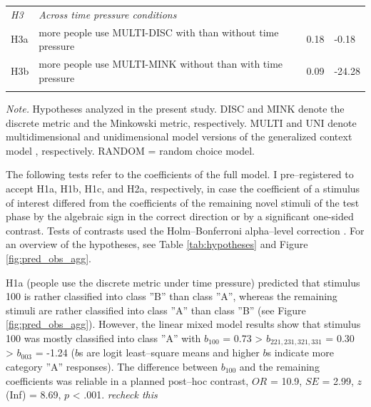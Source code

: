 \documentclass[a4paper,man,natbib]{apa6}
\begin{document}
\begin{table}
\begin{center}
\begin{threeparttable}
\begin{tabular*}{\textwidth}{lp{55mm}p{100mm}ll}
\midrule
\multicolumn{1}{l}{\emph{H3}} & \multicolumn{1}{l}{\emph{Across time pressure conditions}} \\
\addlinespace
H3a & \multicolumn{2}{p{150mm}}{more people use MULTI-DISC with than without time pressure} & 0.18 & -0.18\\
\addlinespace
H3b & \multicolumn{2}{p{150mm}}{more people use MULTI-MINK without than with time pressure} & 0.09 & -24.28\\
\bottomrule
\addlinespace
\end{tabular*}
\begin{tablenotes}[para]
\textit{Note.} Hypotheses analyzed in the present study. DISC and MINK denote the discrete metric and the Minkowski metric, respectively. MULTI and UNI denote multidimensional and unidimensional model versions of the generalized context model \citep{nosofsky1989further}, respectively. RANDOM = random choice model.
\end{tablenotes}
\end{threeparttable}
\end{center}
\end{table}
\vspace{\baselineskip}

The following tests refer to the coefficients of the full model. I pre--registered to accept H1a, H1b, H1c, and H2a, respectively, in case the coefficient of a stimulus of interest differed from the coefficients of the remaining novel stimuli of the test phase by the algebraic sign in the correct direction or by a significant one-sided contrast. Tests of contrasts used the Holm--Bonferroni alpha--level correction \citep{holm1979simple}. For an overview of the hypotheses, see Table \ref{tab:hypotheses} and Figure \ref{fig:pred_obs_agg}. 

H1a (people use the discrete metric under time pressure) predicted that stimulus 100 is rather classified into class ''B'' than class ''A'', whereas the remaining stimuli are rather classified into class ''A'' than class ''B'' (see Figure \ref{fig:pred_obs_agg}). However, the linear mixed model results show that stimulus 100 was mostly classified into class ''A'' with $b_{100}$ = 0.73 > $ b_{221,231,321,331}$ = 0.30 > $b_{003}$ = -1.24 ($b$s are logit least--square means and higher $b$s indicate more category ''A'' responses). The difference between $b_{100}$ and the remaining coefficients was reliable in a planned post--hoc contrast, $OR$ = 10.9, $SE$ = 2.99, $z$(Inf) = 8.69, $p$ < .001. \textit{recheck this} 
\end{document}

